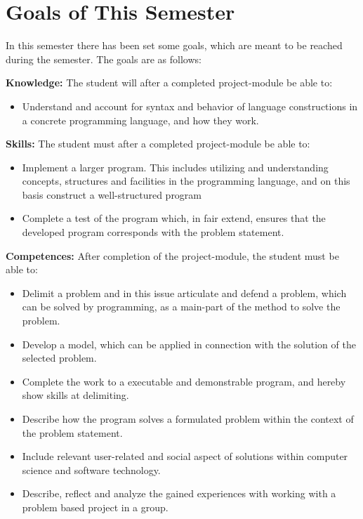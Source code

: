 \section{Goals of This Semester}
In this semester there has been set some goals, which are meant to be reached during the semester. The goals are as follows: 

\textbf{Knowledge:} \newline
	The student will after a completed project-module be able to:
	\begin{itemize}
			\item Understand and account for syntax and behavior of language constructions in a concrete programming language, and how they work.
	\end{itemize}

\textbf{Skills:} \newline
	The student must after a completed project-module be able to:
	\begin{itemize}
		\item Implement a larger program. This includes utilizing and understanding concepts, structures and facilities in the programming language, and on this basis construct a well-structured program
		\item Complete a test of the program which, in fair extend, ensures that the developed program corresponds with the problem statement. 
	\end{itemize}

\textbf{Competences:} \newline
	After completion of the project-module, the student must be able to:
	\begin{itemize}
		\item Delimit a problem and in this issue articulate and defend a problem, which can be solved by programming, as a main-part of the method to solve the problem.	
		\item Develop a model, which can be applied in connection with the solution of the selected problem. 
		\item Complete the work to a executable and demonstrable program, and hereby show skills at delimiting. 
		\item Describe how the program solves a formulated problem within the context of the problem statement. 
		\item Include relevant user-related and social aspect of solutions within computer science and software technology.
		\item Describe, reflect and analyze the gained experiences with working with a problem based project in a group.
	\end{itemize}

